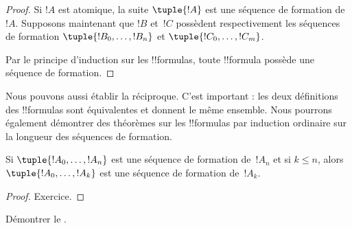 \documentclass[../../../include/open-logic-section]{subfiles}
\begin{document}
\begin{proof}
Si $!A$ est atomique, la suite $\tuple{!A}$ est une séquence de
formation de~$!A$.
%
Supposons maintenant que $!B$ et~$!C$ possèdent respectivement les
séquences de formation $\tuple{!B_0,\dotsc,!B_n}$ et
$\tuple{!C_0,\dotsc,!C_m}$.
%
\begin{enumerate}
\end{enumerate}
Par le principe d'induction sur les !!{formula}s, toute !!{formula}
possède une séquence de formation.
\end{proof}

Nous pouvons aussi établir la réciproque. C'est important : les deux
définitions des !!{formula}s sont équivalentes et donnent le même
ensemble. Nous pourrons également démontrer des théorèmes sur les
!!{formula}s par induction ordinaire sur la longueur des séquences
de formation.

\begin{lem}
Si $\tuple{!A_0,\dotsc,!A_n}$ est une séquence de formation de~$!A_n$
et si $k \leq n$, alors $\tuple{!A_0,\dotsc,!A_k}$ est une séquence
de formation de~$!A_k$.
\end{lem}

\begin{proof}
Exercice.
\end{proof}

\begin{prob}
Démontrer le .
\end{prob}
\end{document}

